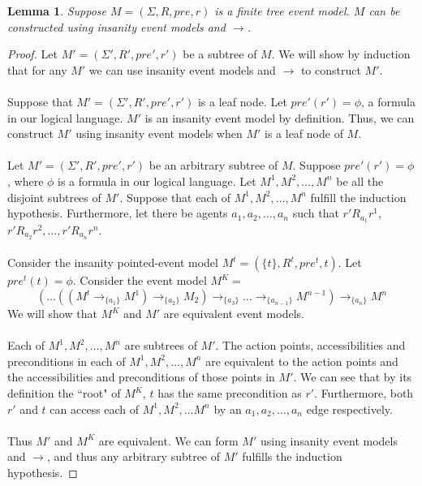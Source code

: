 \documentclass[12pt, a4paper, titlepage]{scrartcl}
\newtheorem{lemma}{Lemma}[section]
\numberwithin{equation}{section}
\begin{document}
\begin{lemma} \label{finTreeConstruct}
Suppose $M = (\Sigma, R, pre, r)$ is a finite tree event model.
$M$ can be constructed using insanity event models and $\to$.
\end{lemma}
\begin{proof}
Let $M' = (\Sigma', R', pre', r')$ be a subtree of $M$.
We will show by induction that for any $M'$ we can use insanity event models and $\to$ to
construct $M'$.\\
\\
Suppose that $M' = (\Sigma', R', pre', r')$ is a leaf node.
Let $pre'(r') = \phi$, a formula in our logical language.
$M'$ is an insanity event model by definition.
Thus, we can construct $M'$ using insanity event models when $M'$ is a leaf node of $M$.\\
\\
Let $M' = (\Sigma', R', pre', r')$ be an arbitrary subtree of $M$.
Suppose $pre'(r') = \phi$, where $\phi$ is a formula in our logical language.
Let $M^1, M^2, \ldots, M^n$ be all the disjoint subtrees of $M'$.
Suppose that each of $M^1, M^2, \ldots, M^n$ fulfill the induction hypothesis.
Furthermore, let there be agents $a_1, a_2, \ldots, a_n$ such that $r' R_{a_1} r^1$, $r' R_{a_2} r^2,
	\ldots, r' R_{a_n} r^n$.\\
\\
Consider the insanity pointed-event model $M^t = (\{ t \}, R^t, pre^t, t)$.
Let $pre^t(t) = \phi$.
Consider the event model $M^K = $
\[
(\ldots((M^t \to_{\{a_1\}} M ^ 1) \to_{\{a_2\}} M_2) \to_{\{a_3\}} \ldots
\to_{\{a_{n-1}\}} M^{n-1} ) \to_{\{a_n\}} M ^ n
\]
We will show that $M^K$ and $M'$ are equivalent event models.\\
\\
Each of $M^1, M^2, \ldots, M^n$ are subtrees of $M'$.
The action points, accessibilities and preconditions in each of $M^1, M^2, \ldots, M^n$ are
equivalent to the action points and the accessibilities and preconditions of those points in $M'$.
We can see that by its definition the ``root" of $M^K$, $t$ has the same precondition as $r'$.
Furthermore, both $r'$ and $t$ can access each of $M^1, M^2, \ldots M^n$ by an $a_1, a_2, \ldots, a_n$ edge
respectively.\\
\\
Thus $M'$ and $M^K$ are equivalent.
We can form $M'$ using insanity event models and $\to$, and thus any arbitrary subtree of $M'$
fulfills the induction hypothesis.
\end{proof}
\end{document}
